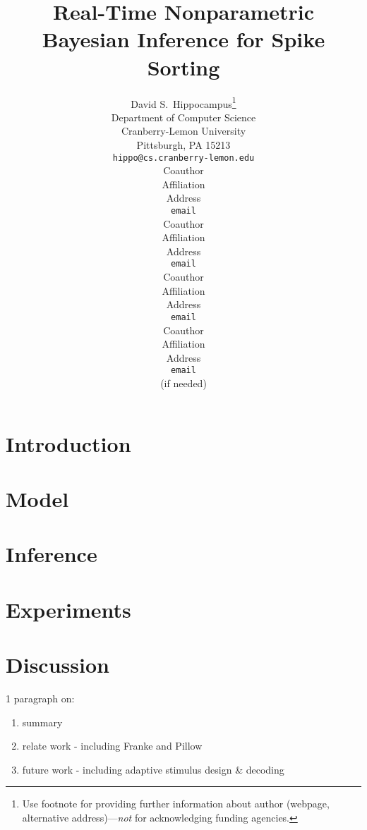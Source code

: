 \documentclass{article} %
\title{Real-Time Nonparametric Bayesian Inference  for  Spike Sorting}
\author{
David S.~Hippocampus\thanks{ Use footnote for providing further information
about author (webpage, alternative address)---\emph{not} for acknowledging
funding agencies.} \\
Department of Computer Science\\
Cranberry-Lemon University\\
Pittsburgh, PA 15213 \\
\texttt{hippo@cs.cranberry-lemon.edu} \\
\And
Coauthor \\
Affiliation \\
Address \\
\texttt{email} \\
\AND
Coauthor \\
Affiliation \\
Address \\
\texttt{email} \\
\And
Coauthor \\
Affiliation \\
Address \\
\texttt{email} \\
\And
Coauthor \\
Affiliation \\
Address \\
\texttt{email} \\
(if needed)\\
}
\begin{document}
 


\maketitle

\begin{abstract}

\end{abstract}

\section{Introduction}



 
\section{Model}


\section{Inference} \label{sec:inf}



\section{Experiments}


 
\section{Discussion}


1 paragraph on:
\begin{enumerate}
	\item summary
	\item relate work - including Franke and Pillow
	\item future work - including adaptive stimulus design \& decoding
\end{enumerate}


\begin{comment}
\subsubsection*{Acknowledgments}

Use unnumbered third level headings for the acknowledgments. All
acknowledgments go at the end of the paper. Do not include 
acknowledgments in the anonymized submission, only in the 
final paper. 
\end{comment}
\end{document}
